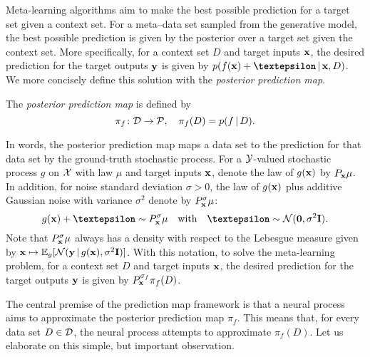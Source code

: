 \documentclass[12pt, twoside]{report}
\begin{document}
Meta-learning algorithms aim to make the best possible prediction for a target set given a context set.
For a meta--data set sampled from the generative model, the best possible prediction is given by the posterior over a target set given the context set.
More specifically, for a context set $D$ and target inputs $\mathbf{x}$, the desired prediction for the target outputs $\mathbf{y}$ is given by
$p(f(\vx) + \vep \cond \vx, D)$. %
We more concisely define this solution with the \emph{posterior prediction map}.

\begin{definition}
    \label{def:posterior_prediction_map}
    The \emph{posterior prediction map} is defined by
    \begin{equation}
        \pi_f \colon \mathcal{D} \to \mathcal{P}, \quad
        \pi_f(D) = p(f \,|\, D).
    \end{equation}
\end{definition}

In words, the posterior prediction map maps a data set to the prediction for that data set by the ground-truth stochastic process.
For a $\mathcal{Y}$-valued stochastic process $g$ on $\mathcal{X}$ with law $\mu$ and target inputs $\mathbf{x}$,
 denote the law of $g(\mathbf{x})$ by $P_{\mathbf{x}} \mu$.
In addition, for noise standard deviation $\sigma > 0$, the law of $g(\mathbf{x})$ plus additive Gaussian noise with variance $\sigma^2$ denote by $P^\sigma_{\mathbf{x}} \mu$:
\begin{equation}
    g(\vx) + \vep \sim P^\sigma_\vx \mu
    \quad\text{with}\quad
    \vep \sim \Normal(\vnull, \sigma^2 \mI).
\end{equation}
Note that $P^\sigma_{\mathbf{x}} \mu$ always has a density with respect to the Lebesgue measure given by $\mathbf{x} \mapsto \mathbb{E}_g[\mathcal{N}(\mathbf{y} \,|\, g(\mathbf{x}), \sigma^2 \mathbf{I})]$.
With this notation, to solve the meta-learning problem, for a context set $D$ and target inputs $\mathbf{x}$, the desired prediction for the target outputs $\mathbf{y}$ is given by $P^{\sigma_f}_{\mathbf{x}} \pi_f(D)$.

The central premise of the prediction map framework is that a neural process aims to approximate the posterior prediction map $\pi_f$. %
This means that, for every data set $D \in \mathcal{D}$, the neural process attempts to approximate $\pi_f(D)$.
Let us elaborate on this simple, but important observation.
\end{document}
